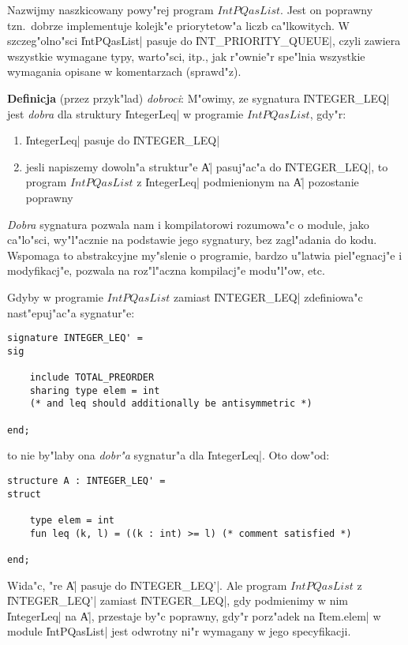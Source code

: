Nazwijmy naszkicowany powy"rej program $IntPQasList$.
Jest on poprawny tzn.\ dobrze implementuje kolejk"e priorytetow"a liczb ca"lkowitych.
W szcze\-g"ol\-no\-"sci \|IntPQasList| pasuje do \|INT_PRIORITY_QUEUE|,
czyli zawiera wszystkie wymagane typy, warto"sci, itp.,
jak r"ownie"r spe"lnia wszystkie wymagania opisane w komentarzach (sprawd"z).

{\bf Definicja} (przez przyk"lad) \emph{dobroci}:
M"owimy, ze sygnatura \|INTEGER_LEQ| jest \emph{dobra} 
dla struktury \|IntegerLeq| w programie $IntPQasList$, gdy"r:
\begin{enumerate}

\item \|IntegerLeq| pasuje do \|INTEGER_LEQ| 

\item jesli napiszemy dowoln"a struktur"e \|A| pasuj"ac"a do \|INTEGER_LEQ|, 
to program $IntPQasList$ z \|IntegerLeq| podmienionym na \|A| pozostanie poprawny

\end{enumerate}

\emph{Dobra} sygnatura pozwala nam i kompilatorowi rozumowa"c o module, jako ca"lo"sci,
wy"l"acznie na podstawie jego sygnatury, bez zagl"adania do kodu.
Wspomaga to abstrakcyjne my"slenie o programie, 
bardzo u"latwia piel"egnacj"e i modyfikacj"e, 
pozwala na roz"l"aczna kompilacj"e modu"l"ow, etc.

Gdyby w programie $IntPQasList$ zamiast \|INTEGER_LEQ| 
zdefiniowa"c nast"epuj"ac"a sygnatur"e:
\begin{verbatim}
signature INTEGER_LEQ' =
sig

    include TOTAL_PREORDER
    sharing type elem = int
    (* and leq should additionally be antisymmetric *)

end;
\end{verbatim}

to nie by"laby ona \emph{dobr"a} sygnatur"a dla \|IntegerLeq|.
Oto dow"od:

\begin{verbatim}
structure A : INTEGER_LEQ' =
struct

    type elem = int
    fun leq (k, l) = ((k : int) >= l) (* comment satisfied *)

end;
\end{verbatim}

Wida"c, "re \|A| pasuje do \|INTEGER_LEQ'|. 
Ale program $IntPQasList$ z \|INTEGER_LEQ'| zamiast \|INTEGER_LEQ|,
gdy podmienimy w nim \|IntegerLeq| na \|A|, przestaje by"c poprawny, 
gdy"r porz"adek na \|Item.elem| w module \|IntPQasList| 
jest odwrotny ni"r wymagany w jego specyfikacji.

